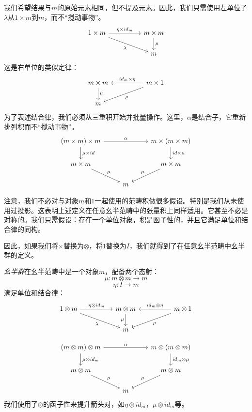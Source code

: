 \documentclass[DaoFP]{subfiles}
\begin{document}
我们希望结果与$m$的原始元素相同，但不提及元素。因此，我们只需使用左单位子$\lambda$从$1 \times m$到$m$，而不“搅动事物”。
\[
 \begin{tikzcd}
 1 \times m
 \arrow[rr, "\eta \times id_m"]
 \arrow[rrd, "\lambda"']
& & m \times m
 \arrow[d, "\mu"]
 \\
 && m
  \end{tikzcd}
\]
这是右单位的类似定律：
\[
 \begin{tikzcd}
 m \times m
 \arrow[d, "\mu"]
 && m \times 1
 \arrow[ll, "id_m \times \eta"']
 \arrow[lld, "\rho"]
 \\
 m
 \end{tikzcd}
\]
为了表述结合律，我们必须从三重积开始并批量操作。这里，$\alpha$是结合子，它重新排列积而不“搅动事物”。
\[
 \begin{tikzcd}
 (m \times m) \times m 
 \arrow[rr, "\alpha"]
 \arrow[d, "\mu \times id"]
 &&
 m \times (m \times m)
 \arrow[d, "id \times \mu"]
 \\
 m \times m 
 \arrow[dr, "\mu"]
& & m \times m
 \arrow[dl, "\mu"']
 \\
&  m
 \end{tikzcd}
\]

注意，我们不必对与对象$m$和$1$一起使用的范畴积做很多假设。特别是我们从未使用过投影。这表明上述定义在任意幺半范畴中的张量积上同样适用。它甚至不必是对称的。我们只需假设：存在一个单位对象，积是函子性的，并且它满足单位和结合律的同构。

因此，如果我们将$\times$替换为$\otimes$，将$1$替换为$I$，我们就得到了在任意幺半范畴中幺半群的定义。

\emph{幺半群}在幺半范畴中是一个对象$m$，配备两个态射：
\[ \mu \colon m \otimes m \to m \]
\[ \eta \colon I \to m \]
满足单位和结合律：
\[
 \begin{tikzcd}
 1 \otimes m
 \arrow[rr, "\eta \otimes id_m"]
 \arrow[rrd, "\lambda"']
& & m \otimes m
 \arrow[d, "\mu"']
&& m \otimes 1
 \arrow[ll, "id_m \otimes \eta"']
 \arrow[lld, "\rho"]
 \\
 && m
  \end{tikzcd}
\]

\[
 \begin{tikzcd}
 (m \otimes m) \otimes m 
 \arrow[rr, "\alpha"]
 \arrow[d, "\mu \otimes id_m"]
 &&
 m \otimes (m \otimes m)
 \arrow[d, "id_m \otimes \mu"]
 \\
 m \otimes m 
 \arrow[dr, "\mu"]
& & m \otimes m
 \arrow[dl, "\mu"']
 \\
&  m
 \end{tikzcd}
\]
我们使用了$\otimes$的函子性来提升箭头对，如$\eta \otimes id_m$，$\mu \otimes id_m$等。
\end{document}
